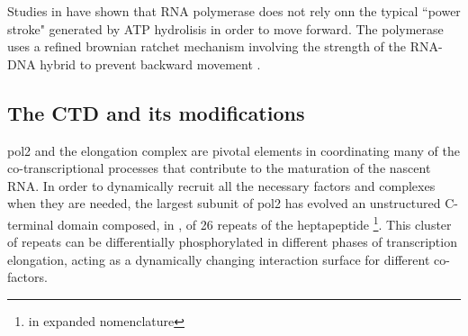 Studies in \coli have shown that RNA polymerase does not rely onn the typical ``power stroke" generated by ATP  hydrolisis in order to move forward. 
The polymerase uses a refined brownian ratchet mechanism involving the strength of the RNA-DNA hybrid to prevent backward movement \citep{barnahum:2005:ratchet}.


\subsection{The CTD and its modifications}
\gls{pol2} and the elongation complex are pivotal elements in coordinating many of the co-transcriptional processes that contribute to the maturation of the nascent RNA.
In order to dynamically recruit all the necessary factors and complexes when they are needed, the largest subunit of \gls{pol2} has evolved an unstructured C-terminal domain composed, in \cer, of 26 repeats of the heptapeptide \ctdshort \footnote{\ctdlong in expanded nomenclature}.
This cluster of repeats can be differentially phosphorylated in different phases of transcription elongation, acting as a dynamically changing interaction surface for different co-factors. 



